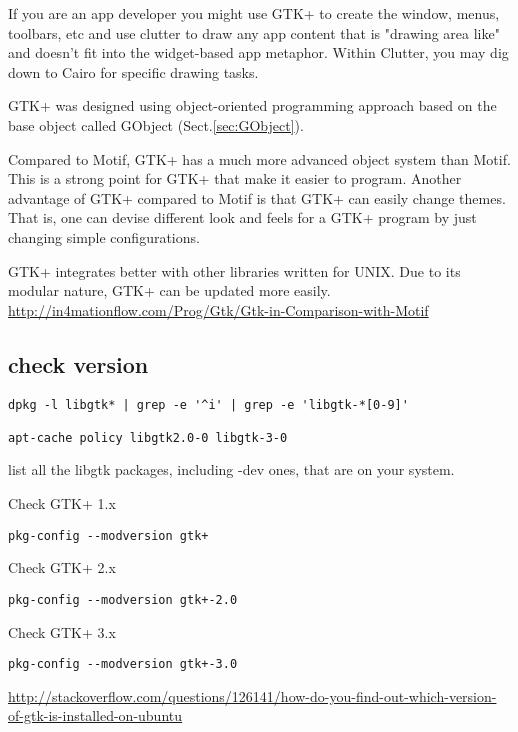 \begin{mdframed}

If you are an app developer you might use GTK+ to create the window, menus,
toolbars, etc and use clutter to draw any app content that is "drawing area
like" and doesn't fit into the widget-based app metaphor. Within Clutter, you
may dig down to Cairo for specific drawing tasks.

\end{mdframed}

GTK+ was designed using object-oriented programming approach based on the
base object called GObject (Sect.\ref{sec:GObject}).

Compared to Motif, GTK+ has a much more advanced object system than Motif. This
is a strong point for GTK+ that make it easier to program.
Another advantage of GTK+ compared to Motif is that GTK+ can easily change
themes. That is, one can devise different look and feels for a GTK+ program by
just changing simple configurations.

GTK+ integrates better with other libraries written for UNIX. Due to its modular
nature, GTK+ can be updated more easily.
\url{http://in4mationflow.com/Prog/Gtk/Gtk-in-Comparison-with-Motif} 

\subsection{check version}

\begin{verbatim}
dpkg -l libgtk* | grep -e '^i' | grep -e 'libgtk-*[0-9]'

apt-cache policy libgtk2.0-0 libgtk-3-0 
\end{verbatim}
list all the libgtk packages, including -dev ones, that are on your system.

Check GTK+ 1.x
\begin{verbatim}
pkg-config --modversion gtk+
\end{verbatim}


Check GTK+ 2.x
\begin{verbatim}
pkg-config --modversion gtk+-2.0
\end{verbatim}

Check GTK+ 3.x
\begin{verbatim}
pkg-config --modversion gtk+-3.0
\end{verbatim}
\url{http://stackoverflow.com/questions/126141/how-do-you-find-out-which-version-of-gtk-is-installed-on-ubuntu}



